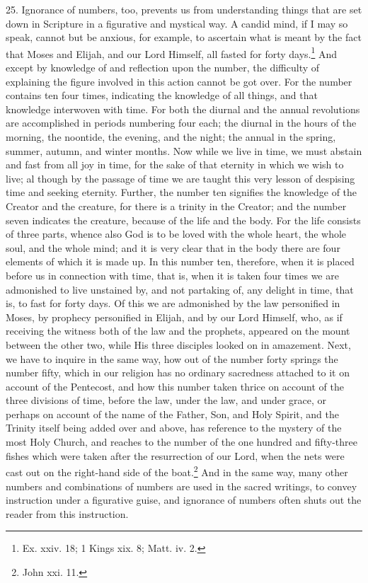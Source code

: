 25. Ignorance of numbers, too, prevents us from understanding things that are set down in Scripture in a figurative and mystical way. A candid mind, if I may so speak, cannot but be anxious, for example, to ascertain what is meant by the fact that Moses and Elijah, and our Lord Himself, all fasted for forty days.\footnote{Ex. xxiv. 18; 1 Kings xix. 8; Matt. iv. 2.} And except by knowledge of and reflection upon the number, the difficulty of explaining the figure involved in this action cannot be got over. For the number contains ten four times, indicating the knowledge of all things, and that knowledge interwoven with time. For both the diurnal and the annual revolutions are accomplished in periods numbering four each; the diurnal in the hours of the morning, the noontide, the evening, and the night; the annual in the spring, summer, autumn, and winter months. Now while we live in time, we must abstain and fast from all joy in time, for the sake of that eternity in which we wish to live; al  though by the passage of time we are taught this very lesson of despising time and seeking eternity. Further, the number ten signifies the knowledge of the Creator and the creature, for there is a trinity in the Creator; and the number seven indicates the creature, because of the life and the body. For the life consists of three parts, whence also God is to be loved with the whole heart, the whole soul, and the whole mind; and it is very clear that in the body there are four elements of which it is made up. In this number ten, therefore, when it is placed before us in connection with time, that is, when it is taken four times we are admonished to live unstained by, and not partaking of, any delight in time, that is, to fast for forty days. Of this we are admonished by the law personified in Moses, by prophecy personified in Elijah, and by our Lord Himself, who, as if receiving the witness both of the law and the prophets, appeared on the mount between the other two, while His three disciples looked on in amazement. Next, we have to inquire in the same way, how out of the number forty springs the number fifty, which in our religion has no ordinary sacredness attached to it on account of the Pentecost, and how this number taken thrice on account of the three divisions of time, before the law, under the law, and under grace, or perhaps on account of the name of the Father, Son, and Holy Spirit, and the Trinity itself being added over and above, has reference to the mystery of the most Holy Church, and reaches to the number of the one hundred and fifty-three fishes which were taken after the resurrection of our Lord, when the nets were cast out on the right-hand side of the boat.\footnote{John xxi. 11.} And in the same way, many other numbers and combinations of numbers are used in the sacred writings, to convey instruction under a figurative guise, and ignorance of numbers often shuts out the reader from this instruction.

